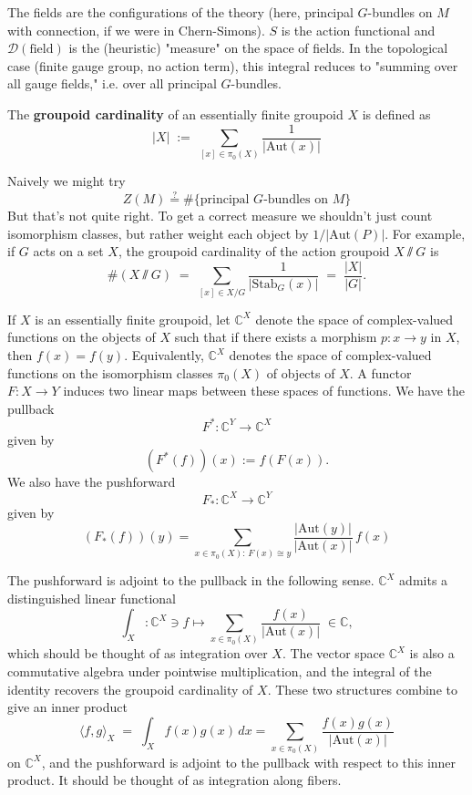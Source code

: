 \documentclass[12pt]{article}
\begin{document}
    The fields are the configurations of the theory (here, principal $G$-bundles on $M$ with connection, if we were in Chern-Simons).
    $S$ is the action functional and $\mathcal{D}(\text{field})$ is the (heuristic) "measure" on the space of fields. In the topological case (finite gauge group, no action term), this integral reduces to "summing over all gauge fields," i.e. over all principal $G$-bundles.


\begin{definition}
    The \textbf{groupoid cardinality} of an essentially finite groupoid $X$ is defined as
    \[
        |X| \;:=\; \sum_{[x]\in \pi_0(X)} \frac{1}{|\mathrm{Aut}(x)|}
    \]
\end{definition}

\begin{remark}
    Naively we might try \[Z(M) \stackrel{?}{=} \#\{\text{principal $G$-bundles on $M$}\}\]
    But that's not quite right. To get a correct measure we shouldn't just count isomorphism classes, but rather weight each object by $1/|\mathrm{Aut}(P)|$. For example, if $G$ acts on a set $X$, the groupoid cardinality of the action groupoid $X\sslash G$ is
    \[\#(X\sslash G) \;=\; \sum_{[x]\in X/G} \frac{1}{|\mathrm{Stab}_G(x)|} \;=\; \frac{|X|}{|G|}.\]
\end{remark}

If $X$ is an essentially finite groupoid, let $\mathbb{C}^X$ denote the space of complex-valued functions on the objects of $X$ such that if there exists a morphism $p : x \to y$ in $X$, then $f(x)=f(y)$. Equivalently, $\mathbb{C}^X$ denotes the space of complex-valued functions on the isomorphism classes $\pi_0(X)$ of objects of $X$. A functor $F : X \to Y$ induces two linear maps between these spaces of functions. We have the pullback
\[
    F^* : \mathbb{C}^Y \to \mathbb{C}^X
\]
given by
\[
    (F^*(f))(x) := f(F(x)).
\]
We also have the pushforward
\[
    F_* : \mathbb{C}^X \to \mathbb{C}^Y
\]
given by
\[
    (F_*(f))(y) = \sum_{x \in \pi_0(X):\,F(x)\cong y} \frac{|\mathrm{Aut}(y)|}{|\mathrm{Aut}(x)|}\, f(x)
\]

The pushforward is adjoint to the pullback in the following sense. $\mathbb{C}^X$ admits a distinguished linear functional
\[
    \int_X : \mathbb{C}^X \ni f \longmapsto \sum_{x \in \pi_0(X)} \frac{f(x)}{|\mathrm{Aut}(x)|} \;\in \mathbb{C},
\]
which should be thought of as integration over $X$. The vector space $\mathbb{C}^X$ is also a commutative algebra under pointwise multiplication, and the integral of the identity recovers the groupoid cardinality of $X$. These two structures combine to give an inner product
\[
    \langle f,g \rangle_X \;=\; \int_X f(x)g(x)\, dx
    = \sum_{x \in \pi_0(X)} \frac{f(x)g(x)}{|\mathrm{Aut}(x)|}
\]
on $\mathbb{C}^X$, and the pushforward is adjoint to the pullback with respect to this inner product. It should be thought of as integration along fibers.
\end{document}
